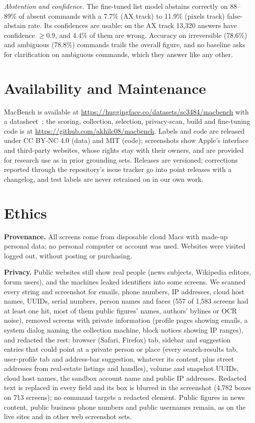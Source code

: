 \documentclass[sigconf,screen,review]{acmart}
\newcommand{\bench}{MacBench}
\begin{document}
\emph{Abstention and confidence.} The fine-tuned list model abstains correctly on 88--89\% of absent commands with a 7.7\% (AX track) to 11.9\% (pixels track) false-abstain rate. Its confidences are usable: on the AX track 13,320 answers have confidence $\geq 0.9$, and 4.4\% of them are wrong. Accuracy on irreversible (78.6\%) and ambiguous (78.8\%) commands trails the overall figure, and no baseline asks for clarification on ambiguous commands, which they answer like any other.

\section{Availability and Maintenance}
\bench{} is available at \url{https://huggingface.co/datasets/sc3484/macbench} with a datasheet~\cite{datasheets}; the scoring, collection, selection, privacy-scan, build and fine-tuning code is at \url{https://github.com/akhilc08/macbench}. Labels and code are released under CC BY-NC 4.0 (data) and MIT (code); screenshots show Apple's interface and third-party websites, whose rights stay with their owners, and are provided for research use as in prior grounding sets. Releases are versioned; corrections reported through the repository's issue tracker go into point releases with a changelog, and test labels are never retrained on in our own work.

\section{Ethics}
\textbf{Provenance.} All screens come from disposable cloud Macs with made-up personal data; no personal computer or account was used. Websites were visited logged out, without posting or purchasing.

\textbf{Privacy.} Public websites still show real people (news subjects, Wikipedia editors, forum users), and the machines leaked identifiers into some screens. We scanned every string and screenshot for emails, phone numbers, IP addresses, cloud host names, UUIDs, serial numbers, person names and faces (557 of 1,583 screens had at least one hit, most of them public figures' names, authors' bylines or OCR noise), removed screens with private information (profile pages showing emails, a system dialog naming the collection machine, block notices showing IP ranges), and redacted the rest: browser (Safari, Firefox) tab, sidebar and suggestion entries that could point at a private person or place (every search-results tab, user-profile tab and address-bar suggestion, whatever its content, plus street addresses from real-estate listings and handles), volume and snapshot UUIDs, cloud host names, the sandbox account name and public IP addresses. Redacted text is replaced in every field and its box is blurred in the screenshot (4,782 boxes on 713 screens); no command targets a redacted element. Public figures in news content, public business phone numbers and public usernames remain, as on the live sites and in other web screenshot sets.
\end{document}
